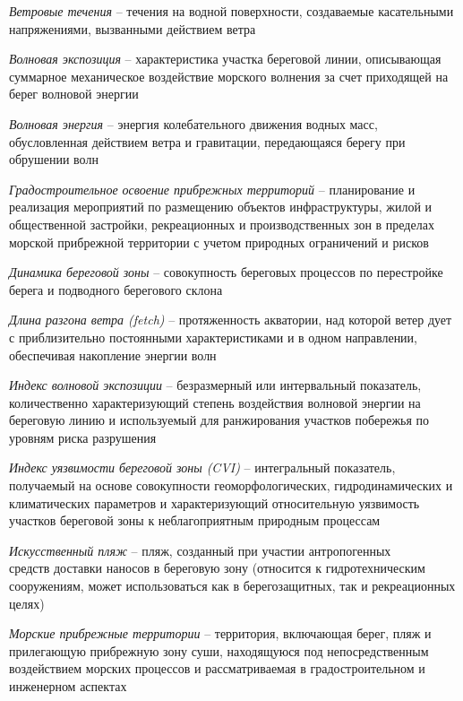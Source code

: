 \noindent \textit{Ветровые течения} -- течения на водной поверхности, создаваемые касательными напряжениями, вызванными действием ветра \cite{sp_277_1325800_2016}

\noindent \textit{Волновая экспозиция} -- характеристика участка береговой линии, описывающая суммарное механическое воздействие морского волнения за счет приходящей на берег волновой энергии

\noindent \textit{Волновая энергия} -- энергия колебательного движения водных масс, обусловленная действием ветра и гравитации, передающаяся берегу при обрушении волн

\noindent \textit{Градостроительное освоение прибрежных территорий} -- планирование и реализация мероприятий по размещению объектов инфраструктуры, жилой и общественной застройки, рекреационных и производственных зон в пределах морской прибрежной территории с учетом природных ограничений и рисков

\noindent \textit{Динамика береговой зоны} -- совокупность береговых процессов по перестройке берега и подводного берегового склона \cite{sp_277_1325800_2016}

\noindent \textit{Длина разгона ветра (fetch)} -- протяженность акватории, над которой ветер дует с приблизительно постоянными характеристиками и в одном направлении, обеспечивая накопление энергии волн

\noindent \textit{Индекс волновой экспозиции} -- безразмерный или интервальный показатель, количественно характеризующий степень воздействия волновой энергии на береговую линию и используемый для ранжирования участков побережья по уровням риска разрушения

\noindent \textit{Индекс уязвимости береговой зоны (CVI)} -- интегральный показатель, получаемый на основе совокупности геоморфологических, гидродинамических и климатических параметров и характеризующий относительную уязвимость участков береговой зоны к неблагоприятным природным процессам

\noindent \textit{Искусственный пляж} -- пляж, созданный при участии антропогенных \\ средств доставки наносов в береговую зону (относится к гидротехническим сооружениям, может использоваться как в берегозащитных, так и рекреационных целях) \cite{sp_277_1325800_2016}

\noindent \textit{Морские прибрежные территории} -- территория, включающая берег, пляж и прилегающую прибрежную зону суши, находящуюся под непосредственным воздействием морских процессов и рассматриваемая в градостроительном и инженерном аспектах


